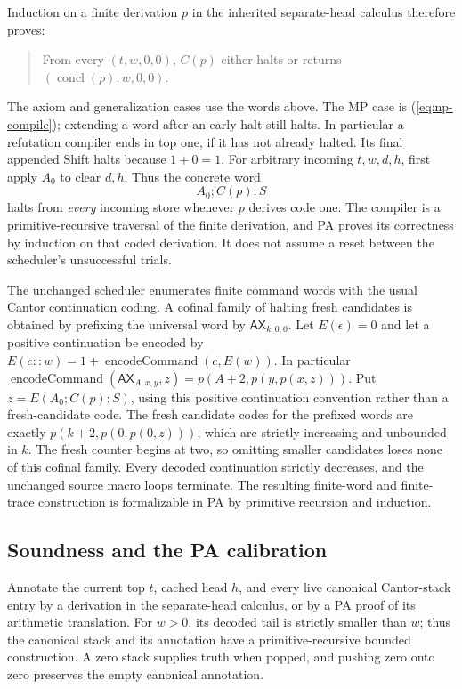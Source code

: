 Induction on a finite derivation $p$ in the inherited separate-head
calculus therefore proves:
\begin{quote}
From every $(t,w,0,0)$, $C(p)$ either halts or returns
$(\operatorname{concl}(p),w,0,0)$.
\end{quote}
The axiom and generalization cases use the words above. The MP case is
(\ref{eq:np-compile}); extending a word after an early halt still halts.
In particular a refutation compiler ends in top one, if it has not already
halted. Its final appended Shift halts because $1+0=1$.
For arbitrary incoming $t,w,d,h$, first apply $A_0$ to clear $d,h$.
Thus the concrete word
\[
                         A_0;C(p);S
\]
halts from \emph{every} incoming store whenever $p$ derives code one.
The compiler is a primitive-recursive traversal of the finite derivation,
and PA proves its correctness by induction on that coded derivation.
It does not assume a reset between the scheduler's unsuccessful trials.

The unchanged scheduler enumerates finite command words with the usual
Cantor continuation coding. A cofinal family of halting fresh candidates
is obtained by prefixing the universal word by
$\mathsf{AX}_{k,0,0}$. Let $E(\epsilon)=0$ and let a positive continuation be encoded by
$E(c::w)=1+\operatorname{encodeCommand}(c,E(w))$. In particular
$\operatorname{encodeCommand}(\mathsf{AX}_{A,x,y},z)
=p(A+2,p(y,p(x,z)))$. Put $z=E(A_0;C(p);S)$, using this positive
continuation convention rather than a fresh-candidate code. The fresh
candidate codes for the prefixed words are exactly
$p(k+2,p(0,p(0,z)))$, which are strictly increasing and
unbounded in $k$. The fresh counter begins at two, so omitting smaller
candidates loses none of this cofinal family. Every decoded continuation
strictly decreases, and the unchanged source macro loops terminate.
The resulting finite-word and finite-trace construction is formalizable
in PA by primitive recursion and induction.

\subsection{Soundness and the PA calibration}

Annotate the current top $t$, cached head $h$, and every live canonical
Cantor-stack entry by a derivation in the separate-head calculus, or by a
PA proof of its arithmetic translation. For $w>0$, its decoded tail is
strictly smaller than $w$; thus the canonical stack and its annotation
have a primitive-recursive bounded construction. A zero stack supplies
truth when popped, and pushing zero onto zero preserves the empty
canonical annotation.

